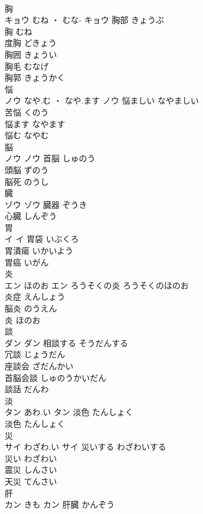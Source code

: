\documentclass[8pt]{extreport}
\begin{document}
\begin{CJK}{UTF8}{min}
\\	胸	
\\	キョウ	むね ・ むな-	キョウ	胸部	きょうぶ	
\\	胸	むね	
\\	度胸	どきょう	
\\	胸囲	きょうい	
\\	胸毛	むなげ	
\\	胸郭	きょうかく	
\\	悩	
\\	ノウ	なや.む ・ なや.ます	ノウ	悩ましい	なやましい	
\\	苦悩	くのう	
\\	悩ます	なやます	
\\	悩む	なやむ	
\\	脳	
\\	ノウ		ノウ	首脳	しゅのう	
\\	頭脳	ずのう	
\\	脳死	のうし	
\\	臓	
\\	ゾウ		ゾウ													臓器	ぞうき	
\\	心臓	しんぞう	
\\	胃	
\\	イ		イ	胃袋	いぶくろ	
\\	胃潰瘍	いかいよう	
\\	胃癌	いがん	
\\	炎	
\\	エン	ほのお	エン	ろうそくの炎	ろうそくのほのお	
\\	炎症	えんしょう	
\\	脳炎	のうえん	
\\	炎	ほのお	
\\	談	
\\	ダン		ダン	相談する	そうだんする	
\\	冗談	じょうだん	
\\	座談会	ざだんかい	
\\	首脳会談	しゅのうかいだん	
\\	談話	だんわ	
\\	淡	
\\	タン	あわ.い	タン	淡色	たんしょく	
\\	淡色	たんしょく	
\\	災	
\\	サイ	わざわ.い	サイ	災いする	わざわいする	
\\	災い	わざわい	
\\	震災	しんさい	
\\	天災	てんさい	
\\	肝	
\\	カン	きも	カン	肝臓	かんぞう	

\end{CJK}
\end{document}
